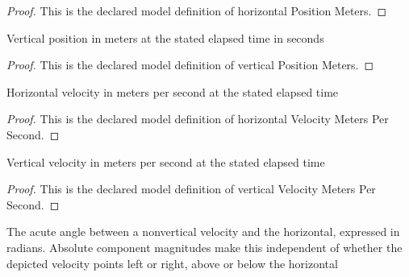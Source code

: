 \begin{proof}
  This is the declared model definition of horizontal Position Meters.
\end{proof}
\begin{definition}
  \label{def:physics:phyx-mini-0741:phyxminiproblems-problemphyxmini0741-verticalpositionmeters}
  Vertical position in meters at the stated elapsed time in seconds
\end{definition}
\begin{proof}
  This is the declared model definition of vertical Position Meters.
\end{proof}
\begin{definition}
  \label{def:physics:phyx-mini-0741:phyxminiproblems-problemphyxmini0741-horizontalvelocitymeterspersecond}
  Horizontal velocity in meters per second at the stated elapsed time
\end{definition}
\begin{proof}
  This is the declared model definition of horizontal Velocity Meters Per Second.
\end{proof}
\begin{definition}
  \label{def:physics:phyx-mini-0741:phyxminiproblems-problemphyxmini0741-verticalvelocitymeterspersecond}
  Vertical velocity in meters per second at the stated elapsed time
\end{definition}
\begin{proof}
  This is the declared model definition of vertical Velocity Meters Per Second.
\end{proof}
\begin{definition}
  \label{def:physics:phyx-mini-0741:phyxminiproblems-problemphyxmini0741-acutevelocityangleradians}
  The acute angle between a nonvertical velocity and the horizontal, expressed in radians. Absolute component magnitudes make this independent of whether the depicted velocity points left or right, above or below the horizontal
\end{definition}
